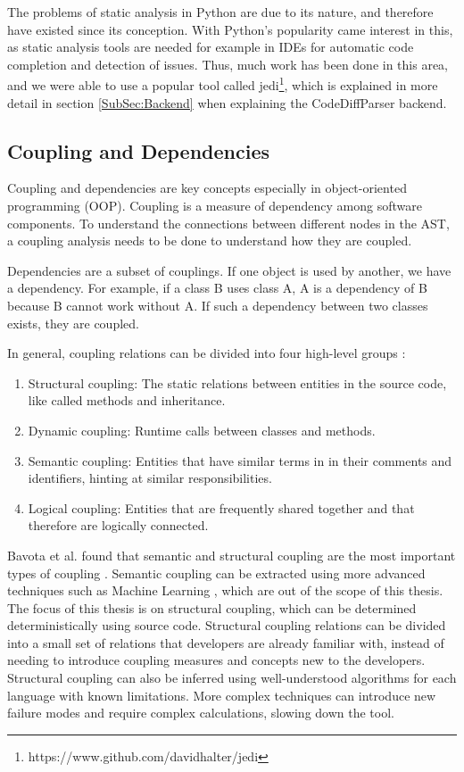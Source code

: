 \documentclass[a4paper,11pt,twoside]{article}
\theoremstyle{definition} %
\renewcommand{\cite}[1]{\citep{#1}}
\begin{document}
The problems of static analysis in Python are due to its nature, and therefore have existed since its conception. With Python’s popularity came interest in this, as static analysis tools are needed for example in IDEs for automatic code completion and detection of issues. Thus, much work has been done in this area, and we were able to use a popular tool called jedi\footnote{https://www.github.com/davidhalter/jedi}, which is explained in more detail in section \ref{SubSec:Backend} when explaining the CodeDiffParser backend.


\subsection{Coupling and Dependencies} \label{SubSec:CouplingDependencies}
Coupling and dependencies are key concepts especially in object-oriented programming (OOP). Coupling is a measure of dependency among software components. To understand the connections between different nodes in the AST, a coupling analysis needs to be done to understand how they are coupled.

Dependencies are a subset of couplings. If one object is used by another, we have a dependency. For example, if a class B uses class A, A is a dependency of B because B cannot work without A. If such a dependency between two classes exists, they are coupled. 

In general, coupling relations can be divided into four high-level groups \cite{FREGNAN2019159, Bavota2013692}:
\begin{enumerate}
    \item Structural coupling: The static relations between entities in the source code, like called methods and inheritance. 
    \item Dynamic coupling: Runtime calls between classes and methods. 
    \item Semantic coupling: Entities that have similar terms in in their comments and identifiers, hinting at similar responsibilities. 
    \item Logical coupling: Entities that are frequently shared together and that therefore are logically connected.
\end{enumerate}

Bavota et al. found that semantic and structural coupling are the most important types of coupling \cite{Bavota2013692}. Semantic coupling can be extracted using more advanced techniques such as Machine Learning \cite{DBLP:journals/corr/abs-1906-07108}, which are out of the scope of this thesis. The focus of this thesis is on structural coupling, which can be determined deterministically using source code. Structural coupling relations can be divided into a small set of relations that developers are already familiar with, instead of needing to introduce coupling measures and concepts new to the developers. Structural coupling can also be inferred using well-understood algorithms for each language with known limitations. More complex techniques can introduce new failure modes and require complex calculations, slowing down the tool. 
\end{document}
